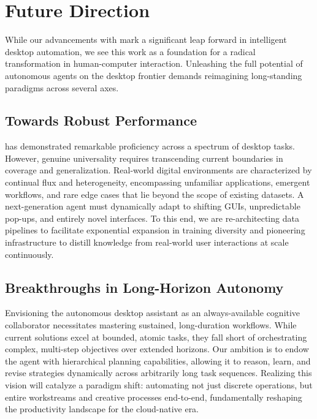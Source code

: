 \section{Future Direction}\label{future_direction}
While our advancements with \computerrl mark a significant leap forward in intelligent desktop automation, we see this work as a foundation for a radical transformation in human-computer interaction. Unleashing the full potential of autonomous agents on the desktop frontier demands reimagining long-standing paradigms across several axes.

\subsection{Towards Robust Performance}
\model has demonstrated remarkable proficiency across a spectrum of desktop tasks. However, genuine universality requires transcending current boundaries in coverage and generalization. Real-world digital environments are characterized by continual flux and heterogeneity, encompassing unfamiliar applications, emergent workflows, and rare edge cases that lie beyond the scope of existing datasets. A next-generation agent must dynamically adapt to shifting GUIs, unpredictable pop-ups, and entirely novel interfaces. To this end, we are re-architecting data pipelines to facilitate exponential expansion in training diversity and pioneering infrastructure to distill knowledge from real-world user interactions at scale continuously. 

\subsection{Breakthroughs in Long-Horizon Autonomy}
Envisioning the autonomous desktop assistant as an always-available cognitive collaborator necessitates mastering sustained, long-duration workflows. While current solutions excel at bounded, atomic tasks, they fall short of orchestrating complex, multi-step objectives over extended horizons. Our ambition is to endow the agent with hierarchical planning capabilities, allowing it to reason, learn, and revise strategies dynamically across arbitrarily long task sequences. Realizing this vision will catalyze a paradigm shift: automating not just discrete operations, but entire workstreams and creative processes end-to-end, fundamentally reshaping the productivity landscape for the cloud-native era.

